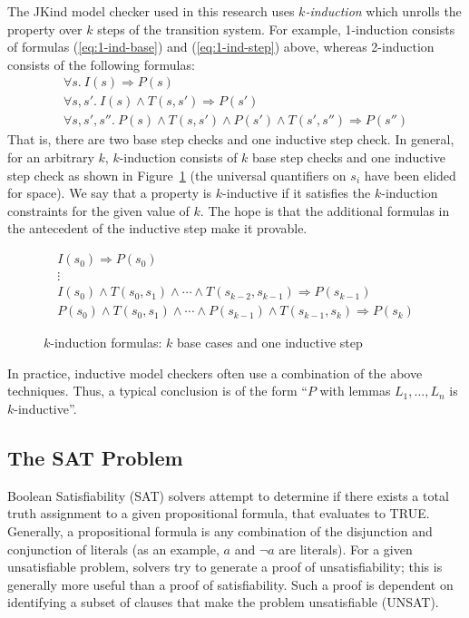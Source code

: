 The JKind model checker used in this research uses {\em
  $k$-induction} which unrolls the property over $k$ steps of the
transition system. For example, 1-induction consists of formulas
(\ref{eq:1-ind-base}) and (\ref{eq:1-ind-step}) above, whereas
2-induction consists of the following formulas:
\begin{gather*}
\forall s.~ I(s) \Rightarrow P(s) \\
\forall s, s'.~ I(s) \land T(s, s') \Rightarrow P(s') \\
\forall s, s', s''.~ P(s) \land T(s, s') \land P(s') \land T(s',
  s'') \Rightarrow P(s'')
\end{gather*}
That is, there are two base step checks and one inductive step check.
In general, for an arbitrary $k$, $k$-induction consists of $k$
base step checks and one inductive step check as shown in
Figure~\ref{fig:k-induction} (the universal quantifiers on $s_i$ have
been elided for space). We say that a property is $k$-inductive if it
satisfies the $k$-induction constraints for the given value of $k$.
The hope is that the additional formulas in the antecedent of the
inductive step make it provable.

\begin{figure}
\begin{gather*}
I(s_0) \Rightarrow P(s_0) \\[-2pt]
%
\vdots \\[2pt]
%
I(s_0) \land T(s_0, s_1) \land \cdots \land T(s_{k-2}, s_{k-1})
\Rightarrow P(s_{k-1}) \\[2pt]
%
P(s_0) \land T(s_0, s_1) \land \cdots \land P(s_{k-1}) \land
T(s_{k-1}, s_k) \Rightarrow P(s_k)
\end{gather*}
\caption{$k$-induction formulas: $k$ base cases and one inductive
  step}
\label{fig:k-induction}
\end{figure}

In practice, inductive model checkers often use a combination of the
above techniques. Thus, a typical conclusion is of the form ``$P$ with
lemmas $L_1, \ldots, L_n$ is $k$-inductive''.

\subsection{The SAT Problem}
Boolean Satisfiability (SAT) solvers attempt to determine if there exists a total truth assignment to a given propositional formula, that evaluates to TRUE. Generally, a propositional formula is any combination of the disjunction and conjunction of literals (as an example, $a$ and $\neg a$ are literals). For a given unsatisfiable problem, solvers try to generate a proof of unsatisfiability; this is generally more useful than a proof of satisfiability. Such a proof is dependent on identifying a subset of clauses that make the problem unsatisfiable (UNSAT). 


